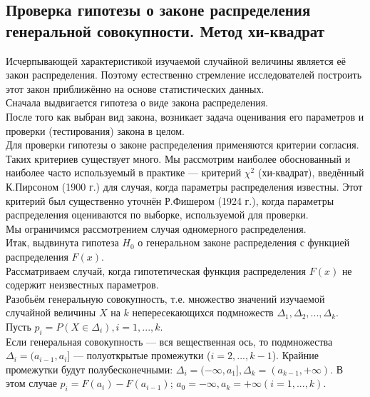 \subsection{Проверка гипотезы о законе распределения генеральной совокупности. Метод хи-квадрат}
Исчерпывающей характеристикой изучаемой случайной величины является её закон распределения. Поэтому естественно стремление исследователей построить этот закон приближённо на основе статистических данных.\\

Сначала выдвигается гипотеза о виде закона распределения.\\

После того как выбран вид закона, возникает задача оценивания его параметров и проверки (тестирования) закона в целом.\\

Для проверки гипотезы о законе распределения применяются критерии согласия. Таких критериев существует много. Мы рассмотрим наиболее обоснованный и наиболее часто используемый в практике — критерий $\chi^2$ (хи-квадрат), введённый К.Пирсоном (1900 г.) для случая, когда параметры распределения известны. Этот критерий был существенно уточнён Р.Фишером (1924 г.), когда параметры распределения оцениваются по выборке, используемой для проверки.\\

Мы ограничимся рассмотрением случая одномерного распределения.\\

Итак, выдвинута гипотеза $H_0$ о генеральном законе распределения с функцией распределения $F(x)$.\\

Рассматриваем случай, когда гипотетическая функция распределения $F(x)$ не содержит неизвестных параметров.\\

Разобьём генеральную совокупность, т.е. множество значений изучаемой случайной величины $X$ на $k$ непересекающихся подмножеств $\Delta_1, \Delta_2, ... , \Delta_k$.\\

Пусть $p_i=P(X\in\Delta_i), i=1,...,k$.\\

Если генеральная совокупность — вся вещественная ось, то подмножества $\Delta_i=(a_{i-1}, a_i]$ — полуоткрытые промежутки ($i=2, ... , k-1$). Крайние промежутки будут полубесконечными: $\Delta_i=(-\infty, a_1], \Delta_k=(a_{k-1}, +\infty)$. В этом случае $p_i=F(a_i)-F(a_{i-1})$; $a_0=-\infty, a_k=+\infty (i=1, ... , k)$.\\


